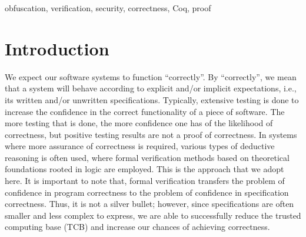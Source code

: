 \documentclass[compsoc,conference,a4paper,10pt,times]{IEEEtran}
\begin{document}
\begin{IEEEkeywords}
obfuscation, verification, security, correctness, Coq, proof
\end{IEEEkeywords}

\section{Introduction}
We expect our software systems to function ``correctly''. By ``correctly'', we mean that a system will behave according to explicit and/or implicit expectations, i.e., its written and/or unwritten specifications. Typically, extensive testing is done to increase the confidence in the correct functionality of a piece of software.
The more testing that is done, the more confidence one has of the likelihood of correctness, but positive testing results are not a proof of correctness.
In systems where more assurance of correctness is required, various types of deductive reasoning is often used, where formal verification methods based on theoretical foundations rooted in logic are employed. This is the approach that we adopt here.  It is important to note that, formal verification transfers the problem of confidence in program correctness to the problem of confidence in specification correctness.  Thus, it is not a silver bullet; however, since specifications are often smaller and less complex to express, we are able to successfully reduce the trusted computing base (TCB) and increase our chances of achieving correctness.
\end{document}
